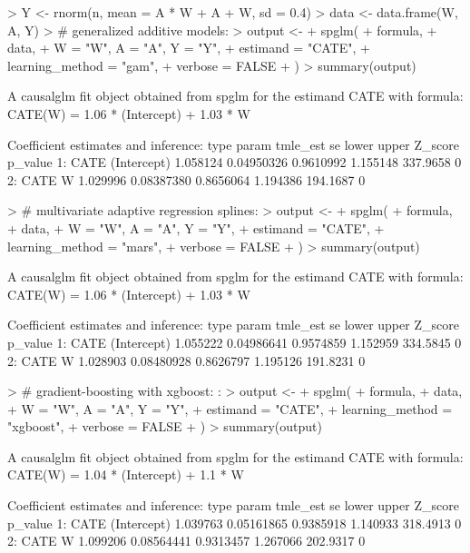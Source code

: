 \documentclass[article]{jss}
\begin{document}
\begin{Schunk}
\begin{Sinput}
> Y <- rnorm(n, mean = A * W + A + W, sd = 0.4)
> data <- data.frame(W, A, Y)
> # generalized additive models:
> output <-
+   spglm(
+     formula,
+     data,
+     W = "W", A = "A", Y = "Y",
+     estimand = "CATE",
+     learning_method = "gam",
+     verbose = FALSE
+   )
> summary(output)
\end{Sinput}
\begin{Soutput}
A causalglm fit object obtained from spglm for the estimand CATE with formula: 
CATE(W) = 1.06 * (Intercept) + 1.03 * W

Coefficient estimates and inference:
   type       param tmle_est         se     lower    upper  Z_score p_value
1: CATE (Intercept) 1.058124 0.04950326 0.9610992 1.155148 337.9658       0
2: CATE           W 1.029996 0.08387380 0.8656064 1.194386 194.1687       0
\end{Soutput}
\begin{Sinput}
> # multivariate adaptive regression splines:
> output <-
+   spglm(
+     formula,
+     data,
+     W = "W", A = "A", Y = "Y",
+     estimand = "CATE",
+     learning_method = "mars",
+     verbose = FALSE
+   )
> summary(output)
\end{Sinput}
\begin{Soutput}
A causalglm fit object obtained from spglm for the estimand CATE with formula: 
CATE(W) = 1.06 * (Intercept) + 1.03 * W

Coefficient estimates and inference:
   type       param tmle_est         se     lower    upper  Z_score p_value
1: CATE (Intercept) 1.055222 0.04986641 0.9574859 1.152959 334.5845       0
2: CATE           W 1.028903 0.08480928 0.8626797 1.195126 191.8231       0
\end{Soutput}
\begin{Sinput}
> # gradient-boosting with xgboost: :
> output <-
+   spglm(
+     formula,
+     data,
+     W = "W", A = "A", Y = "Y",
+     estimand = "CATE",
+     learning_method = "xgboost",
+     verbose = FALSE
+   )
> summary(output)
\end{Sinput}
\begin{Soutput}
A causalglm fit object obtained from spglm for the estimand CATE with formula: 
CATE(W) = 1.04 * (Intercept) + 1.1 * W

Coefficient estimates and inference:
   type       param tmle_est         se     lower    upper  Z_score p_value
1: CATE (Intercept) 1.039763 0.05161865 0.9385918 1.140933 318.4913       0
2: CATE           W 1.099206 0.08564441 0.9313457 1.267066 202.9317       0
\end{Soutput}
\end{Schunk}
\end{document}
